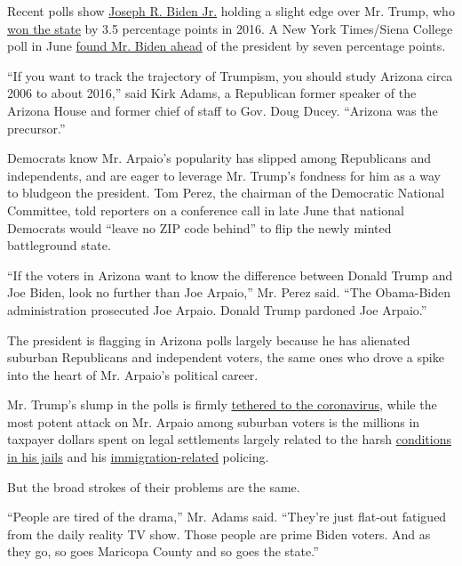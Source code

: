 Recent polls show
\href{https://www.nytimes.com/interactive/2020/us/elections/joe-biden.html}{Joseph
R. Biden Jr.} holding a slight edge over Mr. Trump, who
\href{https://www.nytimes.com/elections/2016/results/arizona}{won the
state} by 3.5 percentage points in 2016. A New York Times/Siena College
poll in June
\href{https://www.nytimes.com/2020/06/25/upshot/poll-2020-biden-battlegrounds.html}{found
Mr. Biden ahead} of the president by seven percentage points.

``If you want to track the trajectory of Trumpism, you should study
Arizona circa 2006 to about 2016,'' said Kirk Adams, a Republican former
speaker of the Arizona House and former chief of staff to Gov. Doug
Ducey. ``Arizona was the precursor.''

Democrats know Mr. Arpaio's popularity has slipped among Republicans and
independents, and are eager to leverage Mr. Trump's fondness for him as
a way to bludgeon the president. Tom Perez, the chairman of the
Democratic National Committee, told reporters on a conference call in
late June that national Democrats would ``leave no ZIP code behind'' to
flip the newly minted battleground state.

``If the voters in Arizona want to know the difference between Donald
Trump and Joe Biden, look no further than Joe Arpaio,'' Mr. Perez said.
``The Obama-Biden administration prosecuted Joe Arpaio. Donald Trump
pardoned Joe Arpaio.''

The president is flagging in Arizona polls largely because he has
alienated suburban Republicans and independent voters, the same ones who
drove a spike into the heart of Mr. Arpaio's political career.

Mr. Trump's slump in the polls is firmly
\href{https://www.nytimes.com/2020/07/18/us/politics/trump-coronavirus-response-failure-leadership.html}{tethered
to the coronavirus}, while the most potent attack on Mr. Arpaio among
suburban voters is the millions in taxpayer dollars spent on legal
settlements largely related to the harsh
\href{https://www.azcentral.com/story/news/local/phoenix/2018/11/28/county-supervisors-approve-300-k-settlement-arpaio-era-jail-death/2138553002/}{conditions
in his jails} and his
\href{https://www.azcentral.com/story/news/local/phoenix/2018/02/01/county-paid-1-million-settle-arpaio-era-immigration-lawsuit/1086824001/}{immigration-related}
policing.

But the broad strokes of their problems are the same.

``People are tired of the drama,'' Mr. Adams said. ``They're just
flat-out fatigued from the daily reality TV show. Those people are prime
Biden voters. And as they go, so goes Maricopa County and so goes the
state.''

